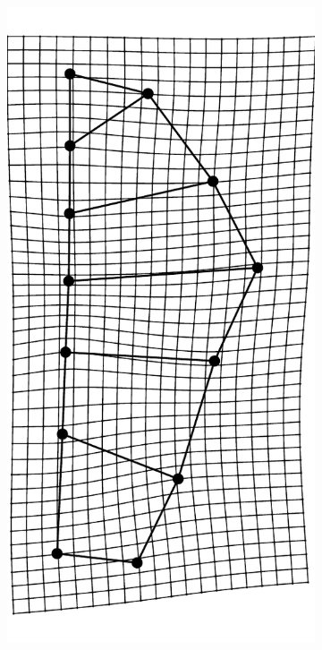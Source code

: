 \documentclass[12pt,letterpaper]{article}\usepackage{graphicx, color}
\begin{document}
\begin{figure}[ht]
  \begin{subfigure}[b]{0.4\textwidth}
    \centering
    \includegraphics[width = \textwidth, height = 0.35\textheight, keepaspectratio = true]{figure/mshape_3}

\end{subfigure}
\end{figure}
\end{document}
